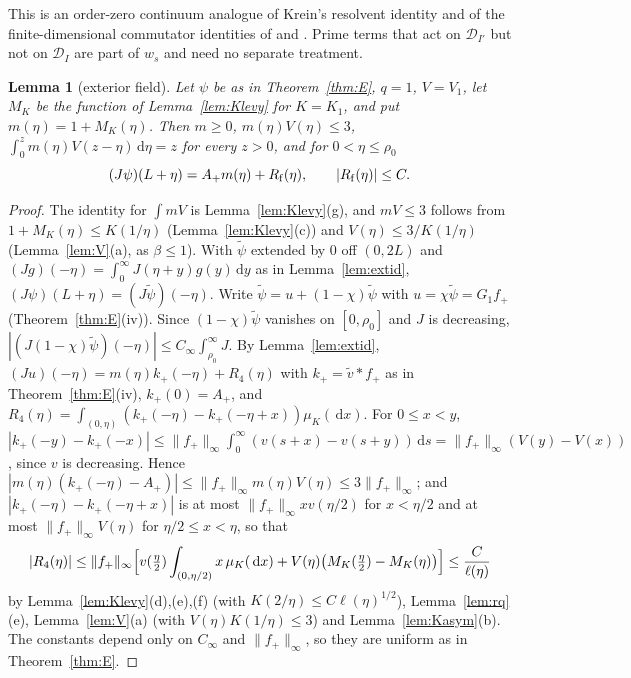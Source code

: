 \documentclass[11pt]{amsart}
\newcommand{\dd}{\,\mathrm{d}}
\newtheorem{lemma}[theorem]{Lemma}
\theoremstyle{definition}
\theoremstyle{remark}
\numberwithin{equation}{section}
\begin{document}
This is an order-zero continuum analogue of Krein's resolvent identity \cite[Lemma~2.3]{Den06} and of the finite-dimensional commutator identities of \cite[Lemma~5.2(ii)]{CCM25} and \cite[Lemma~5.1(ii)]{CvS}. Prime terms that act on $\mathcal D_{I'}$ but not on $\mathcal D_I$ are part of $w_s$ and need no separate treatment.

\begin{lemma}[exterior field]\label{lem:field}
Let $\psi$ be as in Theorem~\ref{thm:E}, $q=1$, $V=V_1$, let $M_K$ be the function of Lemma~\ref{lem:Klevy} for $K=K_1$, and put $m(\eta)=1+M_K(\eta)$. Then $m\ge0$, $m(\eta)V(\eta)\le3$, $\int_0^zm(\eta)V(z-\eta)\dd\eta=z$ for every $z>0$, and for $0<\eta\le\rho_0$
\[
(J\psi)(L+\eta)=A_+m(\eta)+R_{\rm f}(\eta),\qquad|R_{\rm f}(\eta)|\le C .
\]
\end{lemma}

\begin{proof}
The identity for $\int mV$ is Lemma~\ref{lem:Klevy}(g), and $mV\le3$ follows from $1+M_K(\eta)\le K(1/\eta)$ (Lemma~\ref{lem:Klevy}(c)) and $V(\eta)\le3/K(1/\eta)$ (Lemma~\ref{lem:V}(a), as $\beta\le1$). With $\tilde\psi$ extended by $0$ off $(0,2L)$ and $(Jg)(-\eta)=\int_0^\infty J(\eta+y)g(y)\dd y$ as in Lemma~\ref{lem:extid}, $(J\psi)(L+\eta)=(J\tilde\psi)(-\eta)$. Write $\tilde\psi=u+(1-\chi)\tilde\psi$ with $u=\chi\tilde\psi=G_1f_+$ (Theorem~\ref{thm:E}(iv)). Since $(1-\chi)\tilde\psi$ vanishes on $[0,\rho_0]$ and $J$ is decreasing, $|(J(1-\chi)\tilde\psi)(-\eta)|\le C_\infty\int_{\rho_0}^\infty J$. By Lemma~\ref{lem:extid}, $(Ju)(-\eta)=m(\eta)k_+(-\eta)+R_4(\eta)$ with $k_+=\tilde v*f_+$ as in Theorem~\ref{thm:E}(iv), $k_+(0)=A_+$, and $R_4(\eta)=\int_{(0,\eta)}(k_+(-\eta)-k_+(-\eta+x))\mu_K(\dd x)$. For $0\le x<y$, $|k_+(-y)-k_+(-x)|\le\|f_+\|_\infty\int_0^\infty(v(s+x)-v(s+y))\dd s=\|f_+\|_\infty(V(y)-V(x))$, since $v$ is decreasing. Hence $|m(\eta)(k_+(-\eta)-A_+)|\le\|f_+\|_\infty m(\eta)V(\eta)\le3\|f_+\|_\infty$; and $|k_+(-\eta)-k_+(-\eta+x)|$ is at most $\|f_+\|_\infty xv(\eta/2)$ for $x<\eta/2$ and at most $\|f_+\|_\infty V(\eta)$ for $\eta/2\le x<\eta$, so that
\[
|R_4(\eta)|\le\|f_+\|_\infty\Bigl[v(\tfrac\eta2)\int_{(0,\eta/2)}x\,\mu_K(\dd x)+V(\eta)\bigl(M_K(\tfrac\eta2)-M_K(\eta)\bigr)\Bigr]\le\frac C{\ell(\eta)}
\]
by Lemma~\ref{lem:Klevy}(d),(e),(f) (with $K(2/\eta)\le C\ell(\eta)^{1/2}$), Lemma~\ref{lem:rq}(e), Lemma~\ref{lem:V}(a) (with $V(\eta)K(1/\eta)\le3$) and Lemma~\ref{lem:Kasym}(b). The constants depend only on $C_\infty$ and $\|f_+\|_\infty$, so they are uniform as in Theorem~\ref{thm:E}.
\end{proof}
\end{document}
